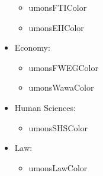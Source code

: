 \documentclass{minimal}
\begin{document}
\begin{itemize}
\begin{itemize}
			\item \textcolor{umonsFTIColor}{umonsFTIColor}
			\item \textcolor{umonsEIIColor}{umonsEIIColor}
		\end{itemize}
		\item Economy:
		\begin{itemize}
			\item \textcolor{umonsFWEGColor}{umonsFWEGColor}
			\item \textcolor{umonsWawaColor}{umonsWawaColor}
		\end{itemize}
		\item Human Sciences:
		\begin{itemize}
			\item \textcolor{umonsSHSColor}{umonsSHSColor}
		\end{itemize}
		\item Law:
		\begin{itemize}
			\item \textcolor{umonsLawColor}{umonsLawColor}
		\end{itemize}
	\end{itemize}
\end{document}
